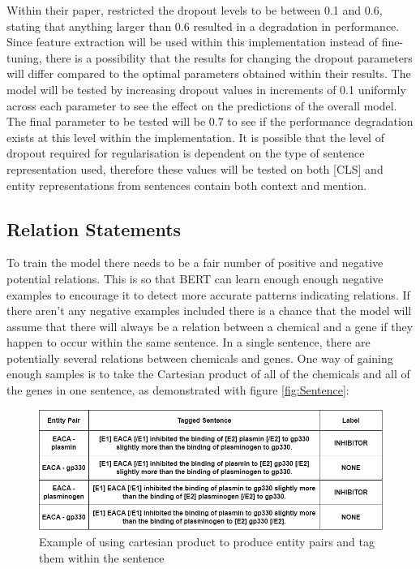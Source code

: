 \documentclass{l4proj}
\begin{document}
Within their paper, \cite{BERT-dropout} restricted the dropout levels to be between 0.1 and 0.6, stating that anything larger than 0.6 resulted in a degradation in performance. Since feature extraction will be used within this implementation instead of fine-tuning, there is a possibility that the results for changing the dropout parameters will differ compared to the optimal parameters obtained within their results. The model will be tested by increasing dropout values in increments of 0.1 uniformly across each parameter to see the effect on the predictions of the overall model. The final parameter to be tested will be 0.7 to see if the performance degradation exists at this level within the implementation. It is possible that the level of dropout required for regularisation is dependent on the type of sentence representation used, therefore these values will be tested on both [CLS] and entity representations from sentences contain both context and mention.

\subsection{Relation Statements}
To train the model there needs to be a fair number of positive and negative potential relations. This is so that BERT can learn enough enough negative examples to encourage it to detect more accurate patterns indicating relations. If there aren't any negative examples included there is a chance that the model will assume that there will always be a relation between a chemical and a gene if they happen to occur within the same sentence. In a single sentence, there are potentially several relations between chemicals and genes. One way of gaining enough samples is to take the Cartesian product of all of the chemicals and all of the genes in one sentence, as demonstrated with figure \ref{fig:Sentence}:

\begin{figure}[htb]
    \centering
    \includegraphics[width=14cm]{images/Tags.png}
  \caption{Example of using cartesian product to produce entity pairs and tag them within the sentence}
  \label{fig:Tags}
\end{figure}
\end{document}
